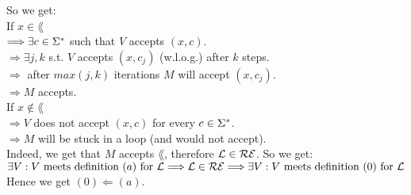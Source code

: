 So we get: \\
If $x \in \lang$ \\
$\Longrightarrow \exists c \in \Sigma^*$ such that $V$ accepts $(x, c)$. \\
$\Longrightarrow \exists j, k$ s.t. $V$ accepts $(x, c_j)$ (w.l.o.g.) after $k$ steps. \\
$\Longrightarrow$ after $max(j, k)$ iterations $M$ will accept $(x, c_j)$. \\
$\Longrightarrow M$ accepts. \\

If $x \notin \lang$ \\
$\Longrightarrow V$ does not accept $(x, c)$ for every $c \in \Sigma^*$. \\
$\Longrightarrow M$ will be stuck in a loop (and would not accept). \\

Indeed, we get that $M$ accepts $\lang$, therefore $\mathcal{L} \in \mathcal{R}\mathcal{E}$. So we get: \\
$\exists V: V \text{ meets definition } (a) \text{ for } \mathcal{L} \Longrightarrow \mathcal{L} \in \mathcal{R}\mathcal{E} \Longrightarrow \exists V: V \text{ meets definition } (0) \text{ for } \mathcal{L}$ \\
Hence we get $(0) \Leftarrow (a)$. \\
